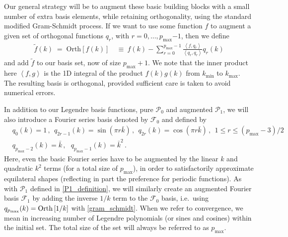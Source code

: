 \documentclass[a4paper,12pt]{extarticle}
\newcommand{\Pmax}{p_\text{max}}
\newcommand{\kbar}{\bar{k}}
\newcommand{\Lbasic}{\mathcal{P}_0}
\newcommand{\Linvk}{\mathcal{P}_1}
\newcommand{\Fbasic}{\mathcal{F}_0}
\newcommand{\Finvk}{\mathcal{F}_1}
\newcommand{\kmin}{{k_\text{min}}}
\newcommand{\kmax}{{k_\text{max}}}
\begin{document}
Our general strategy will be to augment these basic building blocks
with a small number of extra basis elements, while retaining orthogonality,
using the standard modified Gram-Schmidt process.
If we want to use some function $f$ to augment a given set of orthogonal functions $q_r$, with $r=0,\ldots,\Pmax$$-$$1$,
then we define
\begin{align}\label{gram_schmidt}
  \tilde {f}(k) \;=\;  \text{Orth}\left [f(k)\right] &~\equiv~ f(k) - \sum_{r=0}^{{\Pmax}\text{$-$}1}\frac{\left\langle f,q_r \right\rangle}{\left\langle q_r,q_r \right\rangle}q_r(k)
\end{align}
and add $\tilde{f}$ to our basis set, now of size $\Pmax+1$.
We note that the inner product here $\left\langle f,g \right\rangle$
is the 1D integral of the product $f(k)g(k)$ from $\kmin$ to $\kmax$.
The resulting basis is orthogonal, provided sufficient
care is taken to avoid numerical errors.

In addition to our Legendre basis functions, pure $\Lbasic$ and augmented $\Linvk$, we will also introduce a Fourier series basis denoted by $\Fbasic$ and defined by
\begin{align}\label{F0_definition}
    &q_{0}(k)    = 1\,, ~~
    q_{2r-1}(k)   = \sin(\pi r\kbar)\,,  ~~
    q_{2r}(k) = \cos(\pi r\kbar)\,,  ~~  1\leq r\leq(\Pmax\text{$-$}3)/2\\
    &q_{\Pmax\text{$-$}2}(k)=\bar k\,, ~~~q_{\Pmax\text{$-$}1}(k)=\bar k^2\,.
    \end{align}
Here, even the basic Fourier series have to be augmented by the linear $k$ and quadratic $k^2$ terms (for a total size of $\Pmax$),
in order to satisfactorily approximate equilateral shapes (reflecting in part the preference for periodic functions). 
As with $\Linvk$ defined in \eqref{P1_definition}, we will similarly create an augmented Fourier basis $\Finvk$ by adding the inverse $1/k$ term to the  $\Fbasic$ basis, i.e.\ using $q_{p_{\rm max}}(k) = \text{Orth}\left[{1}/ {k}\right]$ with \eqref{gram_schmidt}.
When we refer to convergence, we mean in increasing number
of Legendre polynomials (or sines and cosines) within the initial set.
The total size of the set will always be referred to as $\Pmax$.
\end{document}
